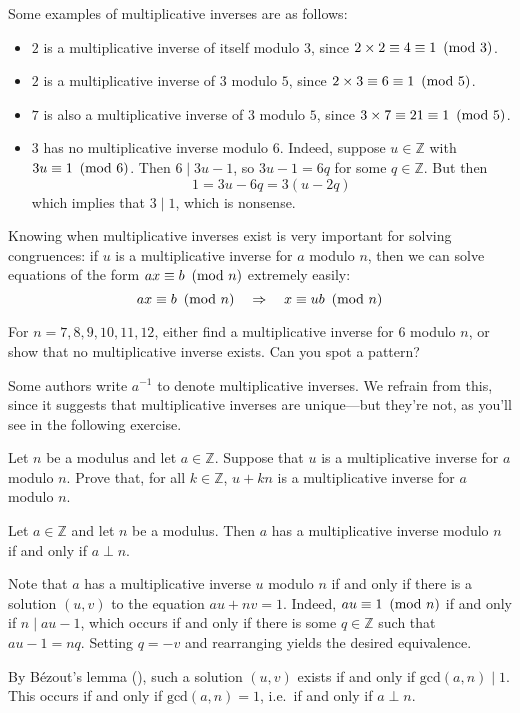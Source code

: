 \begin{example}
Some examples of multiplicative inverses are as follows:
\begin{itemize}
\item $2$ is a multiplicative inverse of itself modulo $3$, since $2 \times 2 \equiv 4 \equiv 1 ~\left(\text{mod}~3\right)$.
\item $2$ is a multiplicative inverse of $3$ modulo $5$, since $2 \times 3 \equiv 6 \equiv 1 ~\left(\text{mod}~5\right)$.
\item $7$ is also a multiplicative inverse of $3$ modulo $5$, since $3 \times 7 \equiv 21 \equiv 1 ~\left(\text{mod}~5\right)$.
\item $3$ has no multiplicative inverse modulo $6$. Indeed, suppose $u \in \mathbb{Z}$ with $3u \equiv 1 ~\left(\text{mod}~6\right)$. Then $6 \mid 3u-1$, so $3u-1 = 6q$ for some $q \in \mathbb{Z}$. But then
\[ 1 = 3u-6q = 3(u-2q) \]
which implies that $3 \mid 1$, which is nonsense.
\end{itemize}
\end{example}

Knowing when multiplicative inverses exist is very important for solving congruences: if $u$ is a multiplicative inverse for $a$ modulo $n$, then we can solve equations of the form $ax \equiv b ~\left(\text{mod}~n\right)$ extremely easily:
\[ ax \equiv b ~\left(\text{mod}~n\right) \quad \Rightarrow \quad x \equiv ub ~\left(\text{mod}~n\right) \]

\begin{exercise}
For $n=7,8,9,10,11,12$, either find a multiplicative inverse for $6$ modulo $n$, or show that no multiplicative inverse exists. Can you spot a pattern?
\end{exercise}

Some authors write $a^{-1}$ to denote multiplicative inverses. We refrain from this, since it suggests that multiplicative inverses are unique---but they're not, as you'll see in the following exercise.

\begin{exercise}
Let $n$ be a modulus and let $a \in \mathbb{Z}$. Suppose that $u$ is a multiplicative inverse for $a$ modulo $n$. Prove that, for all $k \in \mathbb{Z}$, $u+kn$ is a multiplicative inverse for $a$ modulo $n$.
\end{exercise}

\begin{proposition} \label{propMultInvExistence}
Let $a \in \mathbb{Z}$ and let $n$ be a modulus. Then $a$ has a multiplicative inverse modulo $n$ if and only if $a \perp n$.
\end{proposition}
\begin{cproof}
Note that $a$ has a multiplicative inverse $u$ modulo $n$ if and only if there is a solution $(u,v)$ to the equation $au+nv=1$. Indeed, $au \equiv 1 ~\left(\text{mod}~n\right)$ if and only if $n \mid au-1$, which occurs if and only if there is some $q \in \mathbb{Z}$ such that $au-1=nq$. Setting $q=-v$ and rearranging yields the desired equivalence.

By B\'{e}zout's lemma (), such a solution $(u,v)$ exists if and only if $\mathrm{gcd}(a,n) \mid 1$. This occurs if and only if $\mathrm{gcd}(a,n) = 1$, i.e.\ if and only if $a \perp n$.
\end{cproof}

